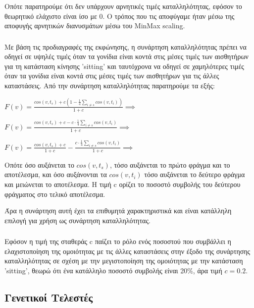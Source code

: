 \documentclass[12pt,a4paper]{article}
\begin{document}
Οπότε παρατηρούμε ότι δεν υπάρχουν αρνητικές τιμές καταλληλότητας, εφόσον το θεωρητικό ελάχιστο είναι ίσο με 0. Ο τρόπος που τις αποφύγαμε ήταν μέσω της αποφυγής αρνητικών διανυσμάτων μέσω του MinMax scaling.

\subsubsection{}

Με βάση τις προδιαγραφές της εκφώνησης, η συνάρτηση καταλληλότητας πρέπει να οδηγεί σε υψηλές τιμές όταν τα γονίδια είναι κοντά στις μέσες τιμές των αισθητήρων για τη κατάσταση κίνησης 'sitting' και ταυτόχρονα να οδηγεί σε χαμηλότερες τιμές όταν τα γονίδια είναι κοντά στις μέσες τιμές των αισθητήρων για τις άλλες καταστάσεις. Από την συνάρτηση καταλληλότητας παρατηρούμε τα εξής:

\begin{center}
    $F(v) = \frac{cos(v,t_s) + c(1-\frac{1}{4}\sum_{i\neq s}cos(v,t_i))}{1+c} \implies$

    $F(v) = \frac{cos(v,t_s) + c - c\cdot\frac{1}{4}\sum_{i\neq s}cos(v,t_i)}{1+c} \implies$

    $F(v) = \frac{cos(v,t_s) + c}{1+c} - \frac{c\cdot\frac{1}{4}\sum_{i\neq s}cos(v,t_i)}{1+c} \implies$
\end{center}

Οπότε όσο αυξάνεται το $cos(v,t_s)$, τόσο αυξάνεται το πρώτο φράγμα και το αποτέλεσμα, και όσο αυξάνονται τα $cos(v,t_i)$ τόσο αυξάνεται το δεύτερο φράγμα και μειώνεται το αποτέλεσμα. Η τιμή c ορίζει το ποσοστό συμβολής του δεύτερου φράγματος στο τελικό αποτέλεσμα.

Άρα η συνάρτηση αυτή έχει τα επιθυμητά χαρακτηριστικά και είναι κατάλληλη επιλογή για χρήση ως συνάρτηση καταλληλότητας.

\subsubsection{}

Εφόσον η τιμή της σταθεράς c παίζει το ρόλο ενός ποσοστού που συμβάλλει η ελαχιστοποίηση της ομοιότητας με τις άλλες καταστάσεις στην έξοδο της συνάρτησης καταλληλότητας σε σχέση με την μεγιστοποίηση της ομοιότητας με την κατάσταση 'sitting', θεωρώ ότι ένα κατάλληλο ποσοστό συμβολής είναι 20\%, άρα τιμή $c = 0.2$.

\subsection{Γενετικοί Τελεστές}
\end{document}
